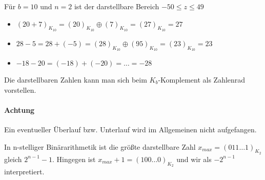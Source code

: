 \begin{example}
Für $b=10$ und $n=2$ ist der darstellbare Bereich $-50 \le  z \le 49$
\begin{itemize}
	\item $(20+7)_{K_{10}} = (20)_{K_{10}} \oplus (7)_{K_{10}} =(27)_{K_{10}}=27$
	\item $28-5 = 28+ (-5)= (28)_{K_{10}} \oplus (95)_{K_{10}} = (23)_{K_{10}} =23 $
	\item $-18-20= (-18)+(-20) = \ldots = -28$
\end{itemize}
\end{example}
Die darstellbaren Zahlen kann man sich beim $K_b$-Komplement als Zahlenrad vorstellen.


\paragraph{Achtung} Ein eventueller Überlauf bzw. Unterlauf wird im Allgemeinen nicht aufgefangen.
\begin{example}
In n-stelliger Binärarithmetik ist die größte darstellbare Zahl $x_{max} = (011\ldots 1)_{K_2}$ gleich  $2^{n-1}-1$. Hingegen ist $x_{max}+1=(100\ldots 0)_{K_2}$ und wir als $-2^{n-1}$ interpretiert.
\end{example}